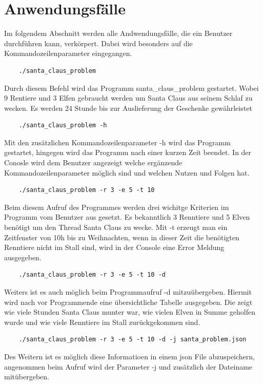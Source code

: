 \documentclass[a4paper,12pt]{article}
\begin{document}
\section{Anwendungsfälle}
Im folgendem Abschnitt werden alle Andwendungsfälle, die ein Benutzer durchführen kann, verkörpert. Dabei wird besonders auf
die Kommandozeilenparameter eingegangen.
\\
\begin{verbatim}
    ./santa_claus_problem
\end{verbatim}
Durch diesem Befehl wird das Programm santa\_claus\_problem gestartet. Wobei 9 Rentiere und 3 Elfen
gebraucht werden um Santa Claus aus seinem Schlaf zu wecken. Es werden 24 Stunde bis zur Auslieferung der Geschenke gewährleistet
\\
\begin{verbatim}
    ./santa_claus_problem -h
\end{verbatim}
Mit den zusätzlichen Kommandozeilenparameter -h wird das Programm gestartet, hingegen wird das Programm
nach einer kurzen Zeit beendet. In der Conosle wird dem Benutzer angezeigt welche ergänzende Kommandozeilenparameter
möglich sind und welchen Nutzen und Folgen hat.
\\
\begin{verbatim}
    ./santa_claus_problem -r 3 -e 5 -t 10
\end{verbatim}
Beim diesem Aufruf des Programmes werden drei wichitge Kriterien im Programm vom Benutzer aus gesetzt.
Es bekanntlich 3 Renntiere und 5 Elven benötigt um den Thread Santa Claus zu wecke. Mit -t erzeugt man ein Zeitfenster von 10h
bis zu Weihnachten, wenn in dieser Zeit die benötigten Renntiere nicht im Stall sind, wird in der Console eine Error Meldung ausgegeben.
\\
\begin{verbatim}
    ./santa_claus_problem -r 3 -e 5 -t 10 -d
\end{verbatim}
Weiters ist es auch möglich beim Programmaufruf -d mitzuübergeben. Hiermit wird nach vor Programmende
eine übersichtliche Tabelle ausgegeben. Die zeigt wie viele Stunden Santa Claus munter war, wie vielen Elven in Summe geholfen wurde und wie viele
Renntiere im Stall zurückgekommen sind.
\\
\begin{verbatim}
    ./santa_claus_problem -r 3 -e 5 -t 10 -d -j santa_problem.json
\end{verbatim}
Des Weitern ist es möglich diese Informatioen in einem json File abzuspeichern, angenommen beim Aufruf wird
der Parameter -j und zusätzlich der Dateiname mitübergeben. 
\end{document}
